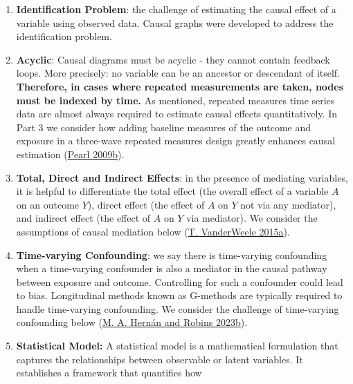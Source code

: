 \documentclass[
  singlecolumn]{report}
\begin{document}
\begin{enumerate}
  selection of variables for adjustment to avoid confounding
  (\protect\hyperlink{ref-pearl1995a}{Pearl and Robins
  1995}).\footnote{Note there is also a Front-Door Criterion, which
    provides another way to estimate causal effects, even in the
    presence of unmeasured confounding variables. It relies on
    identifying a variable (or set of variables) that mediates the
    entire effect of the treatment on the outcome. The front-door
    criterion is rarely used in practice.}
\item
  \textbf{Identification Problem}: the challenge of estimating the
  causal effect of a variable using observed data. Causal graphs were
  developed to address the identification problem.
\item
  \textbf{Acyclic}: Causal diagrams must be acyclic - they cannot
  contain feedback loops. More precisely: no variable can be an ancestor
  or descendant of itself. \textbf{Therefore, in cases where repeated
  measurements are taken, nodes must be indexed by time.} As mentioned,
  repeated measures time series data are almost always required to
  estimate causal effects quantitatively. In Part 3 we consider how
  adding baseline measures of the outcome and exposure in a three-wave
  repeated measures design greatly enhances causal estimation
  (\protect\hyperlink{ref-pearl2009a}{Pearl 2009b}).
\item
  \textbf{Total, Direct and Indirect Effects}: in the presence of
  mediating variables, it is helpful to differentiate the total effect
  (the overall effect of a variable \(A\) on an outcome \(Y\)), direct
  effect (the effect of \(A\) on \(Y\) not via any mediator), and
  indirect effect (the effect of \(A\) on \(Y\) via mediator). We
  consider the assumptions of causal mediation below
  (\protect\hyperlink{ref-vanderweele2015a}{T. VanderWeele 2015a}).
\item
  \textbf{Time-varying Confounding}: we say there is time-varying
  confounding when a time-varying confounder is also a mediator in the
  causal pathway between exposure and outcome. Controlling for such a
  confounder could lead to bias. Longitudinal methods known as G-methods
  are typically required to handle time-varying confounding. We consider
  the challenge of time-varying confounding below
  (\protect\hyperlink{ref-hernuxe1n2023}{M. A. Hernán and Robins
  2023b}).
\item
  \textbf{Statistical Model:} A statistical model is a mathematical
  formulation that captures the relationships between observable or
  latent variables. It establishes a framework that quantifies how

\end{enumerate}
\end{document}
